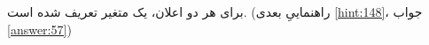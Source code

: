\section{}
\paragraph{}\label{hint:83}
برای هر دو اعلان، یک متغیر تعریف شده است. (راهنماییِ بعدی \ref{hint:148}، جواب \ref{answer:57})